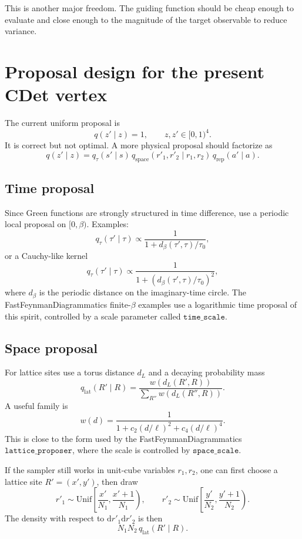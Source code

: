 \documentclass[11pt]{article}
\newcommand{\dd}{\mathrm{d}}
\newcommand{\1}{\mathbf{1}}
\begin{document}
This is another major freedom.  The guiding function should be cheap enough
to evaluate and close enough to the magnitude of the target observable to
reduce variance.

\section{Proposal design for the present CDet vertex}

The current uniform proposal is
\[
  q(z'\mid z)=1,\qquad z,z'\in[0,1)^4.
\]
It is correct but not optimal.  A more physical proposal should factorize as
\[
  q(z'\mid z)
  =
  q_\tau(s'\mid s)\,
  q_{\mathrm{space}}(r'_1,r'_2\mid r_1,r_2)\,
  q_{\mathrm{rep}}(a'\mid a).
\]

\subsection{Time proposal}

Since Green functions are strongly structured in time difference, use a
periodic local proposal on \([0,\beta)\).  Examples:
\[
  q_\tau(\tau'\mid\tau)
  \propto
  \frac{1}{1+d_\beta(\tau',\tau)/\tau_0},
\]
or a Cauchy-like kernel
\[
  q_\tau(\tau'\mid\tau)
  \propto
  \frac{1}{1+\left(d_\beta(\tau',\tau)/\tau_0\right)^2},
\]
where \(d_\beta\) is the periodic distance on the imaginary-time circle.
The FastFeynmanDiagrammatics finite-\(\beta\) examples use a logarithmic time
proposal of this spirit, controlled by a scale parameter called
\(\texttt{time\_scale}\).

\subsection{Space proposal}

For lattice sites use a torus distance \(d_L\) and a decaying probability
mass
\[
  q_{\mathrm{lat}}(R'\mid R)
  =
  \frac{w(d_L(R',R))}{\sum_{R''}w(d_L(R'',R))}.
\]
A useful family is
\[
  w(d)=
  \frac{1}{1+c_2(d/\ell)^2+c_4(d/\ell)^4}.
\]
This is close to the form used by the FastFeynmanDiagrammatics
\(\texttt{lattice\_proposer}\), where the scale is controlled by
\(\texttt{space\_scale}\).

If the sampler still works in unit-cube variables \(r_1,r_2\), one can first
choose a lattice site \(R'=(x',y')\), then draw
\[
  r'_1\sim \mathrm{Unif}\left[\frac{x'}{N_1},\frac{x'+1}{N_1}\right),
  \qquad
  r'_2\sim \mathrm{Unif}\left[\frac{y'}{N_2},\frac{y'+1}{N_2}\right).
\]
The density with respect to \(\dd r'_1\dd r'_2\) is then
\[
  N_1N_2\,q_{\mathrm{lat}}(R'\mid R).
\]
\end{document}
